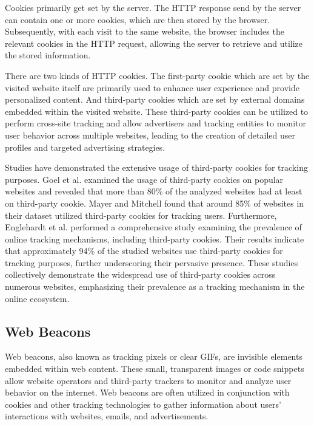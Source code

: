 Cookies primarily get set by the server. The HTTP response send by the server can contain one or more cookies, which 
are then stored by the browser. Subsequently, with each visit to the same website, the browser includes the relevant
cookies in the HTTP request, allowing the server to retrieve and utilize the stored information.

There are two kinds of HTTP cookies. The first-party cookie which are set by the visited website itself are primarily
used to enhance user experience and provide personalized content. And third-party cookies which are set by external 
domains embedded within the visited website. These third-party cookies can be utilized to perform cross-site tracking 
and allow advertisers and tracking entities to monitor user behavior across multiple websites, leading to the creation
of detailed user profiles and targeted advertising strategies.

Studies have demonstrated the extensive usage of third-party cookies for tracking purposes. Goel et al. \cite{goel2010anatomy} examined the usage 
of third-party cookies on popular websites and revealed that more than 80\% of the analyzed websites had at least on third-party cookie. Mayer and Mitchell \cite{mayer2012third}
found that around 85\% of websites in their dataset utilized third-party cookies for tracking users. Furthermore, Englehardt et al. \cite{englehardt2016online}
performed a comprehensive study examining the prevalence of online tracking mechanisms, including third-party cookies. Their results indicate 
that approximately 94\% of the studied websites use third-party cookies for tracking purposes,
further underscoring their pervasive presence.
These studies collectively demonstrate the widespread use of third-party cookies across numerous websites,
emphasizing their prevalence as a tracking mechanism in the online ecosystem.

\subsection{Web Beacons}
Web beacons, also known as tracking pixels or clear GIFs, are invisible elements embedded within web content.
These small, transparent images or code snippets allow website operators and third-party trackers to monitor
and analyze user behavior on the internet. Web beacons are often utilized in conjunction with cookies and
other tracking technologies to gather information about users' interactions with websites,
emails, and advertisements.

